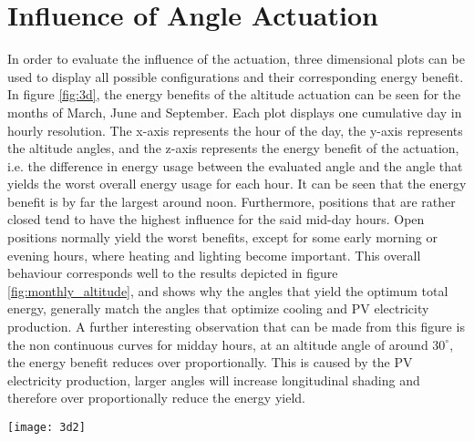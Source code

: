 \section{Influence of Angle Actuation}
	In order to evaluate the influence of the actuation, three dimensional plots can be used to display all possible configurations and their corresponding energy benefit. In figure \ref{fig:3d}, the energy benefits of the altitude actuation can be seen for the months of March, June and September. Each plot displays one cumulative day in hourly resolution. The x-axis represents the hour of the day, the y-axis represents the altitude angles, and the z-axis represents the energy benefit of the actuation, i.e. the difference in energy usage between the evaluated angle and the angle that yields the worst overall energy usage for each hour. It can be seen that the energy benefit is by far the largest around noon. Furthermore, positions that are rather closed tend to have the highest influence for the said mid-day hours. Open positions normally yield the worst benefits, except for some early morning or evening hours, where heating and lighting become important. This overall behaviour corresponds well to the results depicted in figure \ref{fig:monthly_altitude}, and shows why the angles that yield the optimum total energy, generally match the angles that optimize cooling and PV electricity production. A further interesting observation that can be made from this figure is the non continuous curves for midday hours, at an altitude angle of around $30^{\circ}$, the energy benefit reduces over proportionally. This is caused by the PV electricity production, larger angles will increase longitudinal shading and therefore over proportionally reduce the energy yield. 

	\begin{figure*}
		\begin{center}
		\texttt{[image: 3d2]}
		\caption{Energy benefits of the altitude actuation for the months of March, June and September. Each plot displays one cumulative day in hourly resolution. The x-axis represents the hour of the day, the y-axis represents the altitude angles, and the z-axis represents the energy benefit of the actuation, i.e. the difference in energy usage between the evaluated angle and the angle that yields the worst overall energy usage for each hour.}
		\label{fig:3d}
		\end{center}
	\end{figure*}



